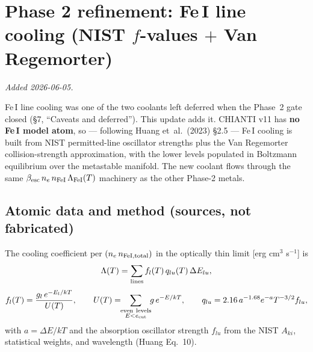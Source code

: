 \documentclass[english,a4paper]{kiseon_memo}
\begin{document}
\section{Phase 2 refinement: Fe\,I line cooling (NIST $f$-values $+$ Van Regemorter)}

\emph{Added 2026-06-05.}

Fe\,I line cooling was one of the two coolants left deferred when the Phase~2 gate
closed (\S7, ``Caveats and deferred''). This update adds it. CHIANTI v11 has
\textbf{no Fe\,I model atom}, so --- following Huang et~al.\ (2023) \S2.5 --- Fe\,I
cooling is built from NIST permitted-line oscillator strengths plus the
Van Regemorter collision-strength approximation, with the lower levels populated
in Boltzmann equilibrium over the metastable manifold. The new coolant flows
through the same \(\beta_{\rm esc}\,n_e\,n_{\rm FeI}\,\Lambda_{\rm FeI}(T)\)
machinery as the other Phase-2 metals.

\subsection{Atomic data and method (sources, not fabricated)}

The cooling coefficient per \((n_e\,n_{\rm FeI,total})\) in the optically thin
limit [erg cm\(^3\) s\(^{-1}\)] is
\[
  \Lambda(T) = \sum_{\rm lines} f_l(T)\,q_{lu}(T)\,\Delta E_{lu},
\]
\[
  f_l(T) = \frac{g_l\,e^{-E_l/kT}}{U(T)},\qquad
  U(T) = \!\!\sum_{\substack{\rm even\ levels\\ E<e_{\rm cut}}}\!\! g\,e^{-E/kT},\qquad
  q_{lu} = 2.16\,a^{-1.68}e^{-a}T^{-3/2} f_{lu},
\]
with \(a = \Delta E/kT\) and the absorption oscillator strength \(f_{lu}\) from the
NIST \(A_{ki}\), statistical weights, and wavelength (Huang Eq.~10).
\end{document}
